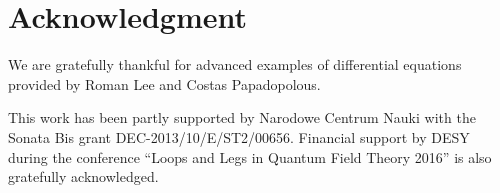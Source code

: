 \documentclass[12pt,a4paper]{article}
\begin{document}
\section*{Acknowledgment}

We are gratefully thankful for advanced examples of differential equations provided by Roman Lee and Costas Papadopolous.

This work has been partly supported by Narodowe Centrum Nauki with the Sonata Bis grant DEC-2013/10/E/ST2/00656.
Financial support by DESY during the conference ``Loops and Legs in Quantum Field Theory 2016'' is also gratefully acknowledged. 


\end{document}
